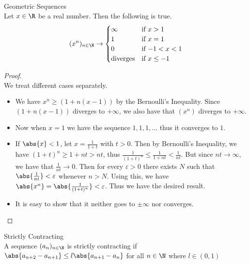\documentclass[a4paper]{article}
\begin{document}
\begin{eg}{Geometric Sequences}{}\\
Let $x\in\R$ be a real number. Then the following is true. $$(x^n)_{n\in\N}\to\begin{cases}
\infty & \text{if $x>1$} \\
1 & \text{if $x=1$} \\
0 & \text{if $-1<x<1$} \\
\text{diverges} & \text{if $x\leq-1$}
\end{cases}$$
\begin{proof}\\ We treat different cases separately. 
\begin{itemize}
\item We have $x^n\geq(1+n(x-1))$ by the Bernoulli's Inequality. Since $(1+n(x-1))$ diverges to $+\infty$, we also have that $(x^n)$ diverges to $+\infty$. 
\item Now when $x=1$ we have the sequence $1,1,1,\dots$ thus it converges to $1$. 
\item If $\abs{x}<1$, let $x=\frac{1}{1+t}$ with $t>0$. Then by Bernoulli's Inequality, we have $(1+t)^n\geq1+nt>nt$, thus $\frac{1}{(1+t)^n}\leq\frac{1}{1+nt}<\frac{1}{nt}$. But since $nt\to\infty$, we have that $\frac{1}{nt}\to 0$. Then for every $\varepsilon>0$ there exists $N$ such that $\abs{\frac{1}{nt}}<\varepsilon$ whenever $n>N$. Using this, we have $\abs{x^n}=\abs{\frac{1}{(1+t)^n}}<\varepsilon$. Thus we have the desired result. 
\item It is easy to show that it neither goes to $\pm\infty$ nor converges. 
\end{itemize}
\end{proof}
\end{eg}

\begin{defn}{Strictly Contracting}{}\\ A sequence $(a_n)_{n\in\N}$ is strictly contracting if $\abs{a_{n+2}-a_{n+1}}\leq l\abs{a_{n+1}-a_n}$ for all $n\in\N$ where $l\in(0,1)$
\end{defn}
\end{document}
